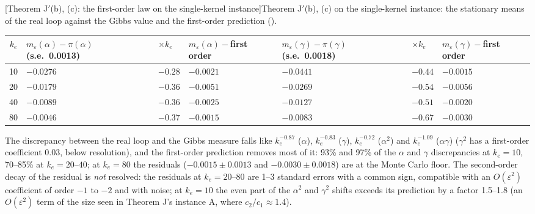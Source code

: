 \medskip
\noindent\begin{minipage}{\textwidth}
\centering\footnotesize
{}[Theorem J$'$(b), (c): the first-order law on the single-kernel instance]{Theorem J$'$(b), (c) on
the single-kernel instance: the stationary means of the real loop against the Gibbs value and the first-order
prediction ().}
\label{tab:thmJp:firstorder}
\begin{tabularx}{\textwidth}{@{}c>{\hsize=1.25\hsize\centering\arraybackslash}X>{\hsize=0.6\hsize\centering\arraybackslash}X>{\hsize=1.15\hsize\centering\arraybackslash}X>{\hsize=1.25\hsize\centering\arraybackslash}X>{\hsize=0.6\hsize\centering\arraybackslash}X>{\hsize=1.15\hsize\centering\arraybackslash}X@{}}
\toprule
$k_e$ & $m_\varepsilon(\alpha) - \pi(\alpha)$ (s.e.\ 0.0013) & $\times k_e$ & $m_\varepsilon(\alpha) - {}$first order
  & $m_\varepsilon(\gamma) - \pi(\gamma)$ (s.e.\ 0.0018) & $\times k_e$ & $m_\varepsilon(\gamma) - {}$first order\\
\midrule
10 & $-0.0276$ & $-0.28$ & $-0.0021$ & $-0.0441$ & $-0.44$ & $-0.0015$\\
20 & $-0.0179$ & $-0.36$ & $-0.0051$ & $-0.0269$ & $-0.54$ & $-0.0056$\\
40 & $-0.0089$ & $-0.36$ & $-0.0025$ & $-0.0127$ & $-0.51$ & $-0.0020$\\
80 & $-0.0046$ & $-0.37$ & $-0.0015$ & $-0.0083$ & $-0.67$ & $-0.0030$\\
\bottomrule
\end{tabularx}
\end{minipage}
\medskip

The discrepancy between the real loop and the Gibbs measure falls like $k_e^{-0.87}$ ($\alpha$), $k_e^{-0.83}$
($\gamma$), $k_e^{-0.72}$ ($\alpha^2$) and $k_e^{-1.09}$ ($\alpha\gamma$) ($\gamma^2$ has a first-order coefficient
$0.03$, below resolution), and the first-order prediction removes most of it: 93\% and 97\% of the $\alpha$ and
$\gamma$ discrepancies at $k_e = 10$, 70--85\% at $k_e = 20$--$40$; at $k_e = 80$ the residuals ($-0.0015\pm0.0013$
and $-0.0030\pm0.0018$) are at the Monte Carlo floor. The second-order decay of the residual is \emph{not} resolved:
the residuals at $k_e = 20$--$80$ are 1--3 standard errors with a common sign, compatible with an $O(\varepsilon^2)$
coefficient of order $-1$ to $-2$ and with noise; at $k_e = 10$ the even part of the $\alpha^2$ and $\gamma^2$ shifts
exceeds its prediction by a factor 1.5--1.8 (an $O(\varepsilon^2)$ term of the size seen in Theorem J's instance A,
where $c_2/c_1\approx1.4$).

